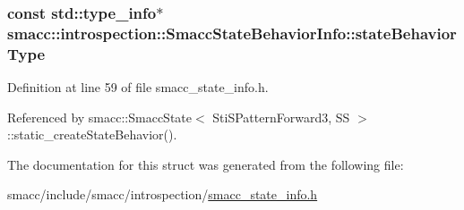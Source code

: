\subsubsection[{\texorpdfstring{state\+Behavior\+Type}{stateBehaviorType}}]{\setlength{\rightskip}{0pt plus 5cm}const std\+::type\+\_\+info$\ast$ smacc\+::introspection\+::\+Smacc\+State\+Behavior\+Info\+::state\+Behavior\+Type}\hypertarget{structsmacc_1_1introspection_1_1SmaccStateBehaviorInfo_a85dc84a01fbd0b830ed6598996c4a7c9}{}\label{structsmacc_1_1introspection_1_1SmaccStateBehaviorInfo_a85dc84a01fbd0b830ed6598996c4a7c9}


Definition at line 59 of file smacc\+\_\+state\+\_\+info.\+h.



Referenced by smacc\+::\+Smacc\+State$<$ Sti\+S\+Pattern\+Forward3, S\+S $>$\+::static\+\_\+create\+State\+Behavior().



The documentation for this struct was generated from the following file\+:\begin{DoxyCompactItemize}
\item 
smacc/include/smacc/introspection/\hyperlink{smacc__state__info_8h}{smacc\+\_\+state\+\_\+info.\+h}\end{DoxyCompactItemize}
